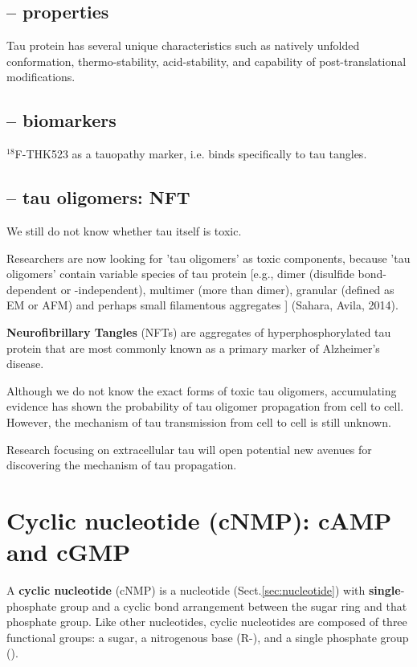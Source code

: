 \subsection{-- properties}

Tau protein has several unique characteristics such as natively unfolded
conformation, thermo-stability, acid-stability, and capability of
post-translational modifications.


\subsection{-- biomarkers}

$^{18}$F-THK523 as a tauopathy marker, i.e.
binds specifically to tau tangles.

\subsection{-- tau oligomers: NFT}
\label{sec:tau-oligomers}
\label{sec:NFT}

We still do not know whether tau itself is toxic. 

Researchers are now looking for 'tau oligomers' as toxic components, because
'tau oligomers' contain variable species of tau protein [e.g., dimer (disulfide
bond-dependent or -independent), multimer (more than dimer), granular (defined
as EM or AFM) and perhaps small filamentous aggregates ] (Sahara, Avila, 2014).

{\bf Neurofibrillary Tangles} (NFTs) are aggregates of hyperphosphorylated tau
protein that are most commonly known as a primary marker of Alzheimer's disease. 

Although we do not know the exact forms of toxic tau oligomers, accumulating
evidence has shown the probability of tau oligomer propagation from cell to
cell.
However, the mechanism of tau transmission from cell to cell is still unknown. 

Research focusing on extracellular tau will open potential new avenues for
discovering the mechanism of tau propagation.


\section{Cyclic nucleotide (cNMP): cAMP and cGMP}
\label{sec:cyclic-nucleotide}


A {\bf cyclic nucleotide} (cNMP) is a nucleotide (Sect.\ref{sec:nucleotide})
with {\bf single}-phosphate group and a cyclic bond arrangement between the
sugar ring and that phosphate group. Like other nucleotides, cyclic nucleotides
are composed of three functional groups: a sugar, a nitrogenous base (R-), and a
single phosphate group ().


